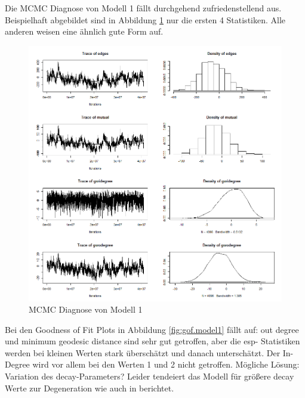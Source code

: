\documentclass[a4paper,ngerman,oneside,titlepage,bibliography=totoc,11pt]{scrreprt}
\begin{document}
Die MCMC Diagnose von Modell 1 fällt durchgehend zufriedenstellend aus. Beispielhaft abgebildet sind in Abbildung \ref{fig:mcmc.diag.model1} nur die ersten 4 Statistiken. Alle anderen weisen eine ähnlich gute Form auf.



\begin{figure}[ht]
	\centering
		\includegraphics[width=1\textwidth]{../ERGM/mcmcdiagergm3.png}
	\caption{MCMC Diagnose von Modell 1}
	\label{fig:mcmc.diag.model1}
\end{figure}


Bei den Goodness of Fit Plots in Abbildung \ref{fig:gof.model1} fällt auf: out degree und minimum geodesic distance sind sehr gut getroffen, aber die esp- Statistiken werden bei kleinen Werten stark überschätzt und danach unterschätzt. Der In-Degree wird vor allem bei den Werten 1 und 2 nicht getroffen. 
Mögliche Lösung: Variation des decay-Parameters? Leider tendeiert das Modell für größere decay Werte zur Degeneration wie auch in \citet{goodreau2008statnet} berichtet.
\end{document}
